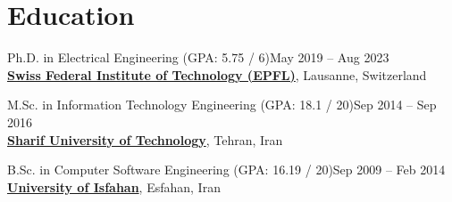 \documentclass[11pt]{article}
\begin{document}
\maketitle




\section{Education}
\begin{outerlist}

	\item Ph.D. in Electrical Engineering (GPA: 5.75 / 6)\hfill {May 2019 -- Aug 2023}\\
	\href{https://www.epfl.ch/en/home/}{\textbf{Swiss Federal Institute of Technology (EPFL)}}, Lausanne, Switzerland

	\item M.Sc. in Information Technology Engineering (GPA: 18.1 / 20)\hfill {Sep 2014 -- Sep 2016}\\
	\href{http://www.en.sharif.edu/}{\textbf{Sharif University of Technology}}, Tehran, Iran 

	\item B.Sc. in Computer Software Engineering (GPA: 16.19 / 20)\hfill {Sep 2009 -- Feb 2014}\\
	\href{http://ui.ac.ir/EN}{\textbf{University of Isfahan}}, Esfahan, Iran 

\end{outerlist}
\end{document}
